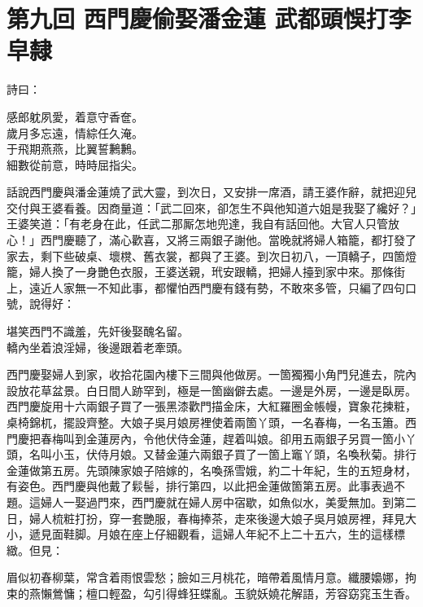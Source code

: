 
\chapter*{第九回 西門慶偷娶潘金蓮 武都頭悞打李皁隸}


詩曰：

\begin{myquote}
感郎躭夙愛，着意守香奩。\\歲月多忘遠，情綜任久淹。\\于飛期燕燕，比翼誓鶼鶼。\\細數從前意，時時屈指尖。
\end{myquote}

話說西門慶與潘金蓮燒了武大靈，到次日，又安排一席酒，請王婆作辭，就把迎兒交付與王婆看養。因商量道：「武二回來，卻怎生不與他知道六姐是我娶了纔好？」王婆笑道：「有老身在此，任武二那厮怎地兜達，我自有話回他。大官人只管放心！」西門慶聽了，滿心歡喜，又將三兩銀子謝他。當晚就將婦人箱籠，都打發了家去，剩下些破桌、壞櫈、舊衣裳，都與了王婆。到次日初八，一頂轎子，四箇燈籠，婦人換了一身艷色衣服，王婆送親，玳安跟轎，把婦人擡到家中來。那條街上，遠近人家無一不知此事，都懼怕西門慶有錢有勢，不敢來多管，只編了四句口號，說得好：

\begin{myquote}
堪笑西門不識羞，先奸後娶醜名留。\\轎內坐着浪淫婦，後邊跟着老牽頭。
\end{myquote}

西門慶娶婦人到家，收拾花園內樓下三間與他做房。一箇獨獨小角門兒進去，院內設放花草盆景。白日間人跡罕到，極是一箇幽僻去處。一邊是外房，一邊是臥房。西門慶旋用十六兩銀子買了一張黑漆歡門描金床，大紅羅圈金帳幔，寶象花揀粧，桌椅錦杌，擺設齊整。大娘子吳月娘房裡使着兩箇丫頭，一名春梅，一名玉簫。西門慶把春梅叫到金蓮房內，令他伏侍金蓮，趕着叫娘。卻用五兩銀子另買一箇小丫頭，名叫小玉，伏侍月娘。又替金蓮六兩銀子買了一箇上竈丫頭，名喚秋菊。排行金蓮做第五房。先頭陳家娘子陪嫁的，名喚孫雪娥，約二十年紀，生的五短身材，有姿色。西門慶與他戴了鬏髻，排行第四，以此把金蓮做箇第五房。此事表過不題。這婦人一娶過門來，西門慶就在婦人房中宿歇，如魚似水，美愛無加。到第二日，婦人梳粧打扮，穿一套艷服，春梅捧茶，走來後邊大娘子吳月娘房裡，拜見大小，遞見面鞋脚。月娘在座上仔細觀看，這婦人年紀不上二十五六，生的這樣標緻。但見：

\begin{myquote}
眉似初春柳葉，常含着雨恨雲愁；臉如三月桃花，暗帶着風情月意。纖腰嬝娜，拘束的燕懶鶯慵；檀口輕盈，勾引得蜂狂蝶亂。玉貌妖嬈花解語，芳容窈窕玉生香。
\end{myquote}

